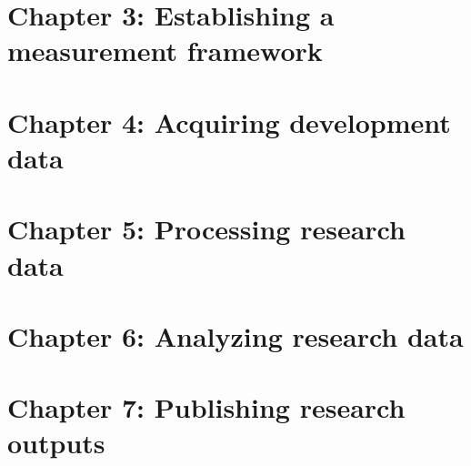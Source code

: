 \chapter{Chapter 3: Establishing a measurement framework}
\label{ch:3}




\chapter{Chapter 4: Acquiring development data}
\label{ch:4}




\chapter{Chapter 5: Processing research data}
\label{ch:5}




\chapter{Chapter 6: Analyzing research data}
\label{ch:6}




\chapter{Chapter 7: Publishing research outputs}
\label{ch:7}



